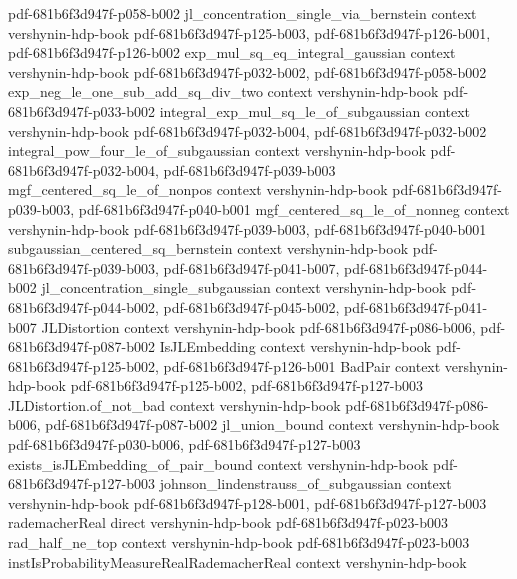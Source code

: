 \begin{theorem}
{    pdf-681b6f3d947f-p058-b002}
\proofstep
  {jl_concentration_single_via_bernstein}
  {context}
  {vershynin-hdp-book}
  {pdf-681b6f3d947f-p125-b003,
    pdf-681b6f3d947f-p126-b001,
    pdf-681b6f3d947f-p126-b002}
\proofstep
  {exp_mul_sq_eq_integral_gaussian}
  {context}
  {vershynin-hdp-book}
  {pdf-681b6f3d947f-p032-b002,
    pdf-681b6f3d947f-p058-b002}
\proofstep
  {exp_neg_le_one_sub_add_sq_div_two}
  {context}
  {vershynin-hdp-book}
  {pdf-681b6f3d947f-p033-b002}
\proofstep
  {integral_exp_mul_sq_le_of_subgaussian}
  {context}
  {vershynin-hdp-book}
  {pdf-681b6f3d947f-p032-b004,
    pdf-681b6f3d947f-p032-b002}
\proofstep
  {integral_pow_four_le_of_subgaussian}
  {context}
  {vershynin-hdp-book}
  {pdf-681b6f3d947f-p032-b004,
    pdf-681b6f3d947f-p039-b003}
\proofstep
  {mgf_centered_sq_le_of_nonpos}
  {context}
  {vershynin-hdp-book}
  {pdf-681b6f3d947f-p039-b003,
    pdf-681b6f3d947f-p040-b001}
\proofstep
  {mgf_centered_sq_le_of_nonneg}
  {context}
  {vershynin-hdp-book}
  {pdf-681b6f3d947f-p039-b003,
    pdf-681b6f3d947f-p040-b001}
\proofstep
  {subgaussian_centered_sq_bernstein}
  {context}
  {vershynin-hdp-book}
  {pdf-681b6f3d947f-p039-b003,
    pdf-681b6f3d947f-p041-b007,
    pdf-681b6f3d947f-p044-b002}
\proofstep
  {jl_concentration_single_subgaussian}
  {context}
  {vershynin-hdp-book}
  {pdf-681b6f3d947f-p044-b002,
    pdf-681b6f3d947f-p045-b002,
    pdf-681b6f3d947f-p041-b007}
\proofstep
  {JLDistortion}
  {context}
  {vershynin-hdp-book}
  {pdf-681b6f3d947f-p086-b006,
    pdf-681b6f3d947f-p087-b002}
\proofstep
  {IsJLEmbedding}
  {context}
  {vershynin-hdp-book}
  {pdf-681b6f3d947f-p125-b002,
    pdf-681b6f3d947f-p126-b001}
\proofstep
  {BadPair}
  {context}
  {vershynin-hdp-book}
  {pdf-681b6f3d947f-p125-b002,
    pdf-681b6f3d947f-p127-b003}
\proofstep
  {JLDistortion.of_not_bad}
  {context}
  {vershynin-hdp-book}
  {pdf-681b6f3d947f-p086-b006,
    pdf-681b6f3d947f-p087-b002}
\proofstep
  {jl_union_bound}
  {context}
  {vershynin-hdp-book}
  {pdf-681b6f3d947f-p030-b006,
    pdf-681b6f3d947f-p127-b003}
\proofstep
  {exists_isJLEmbedding_of_pair_bound}
  {context}
  {vershynin-hdp-book}
  {pdf-681b6f3d947f-p127-b003}
\proofstep
  {johnson_lindenstrauss_of_subgaussian}
  {context}
  {vershynin-hdp-book}
  {pdf-681b6f3d947f-p128-b001,
    pdf-681b6f3d947f-p127-b003}
\proofstep
  {rademacherReal}
  {direct}
  {vershynin-hdp-book}
  {pdf-681b6f3d947f-p023-b003}
\proofstep
  {rad_half_ne_top}
  {context}
  {vershynin-hdp-book}
  {pdf-681b6f3d947f-p023-b003}
\proofstep
  {instIsProbabilityMeasureRealRademacherReal}
  {context}
  {vershynin-hdp-book}

\end{theorem}
